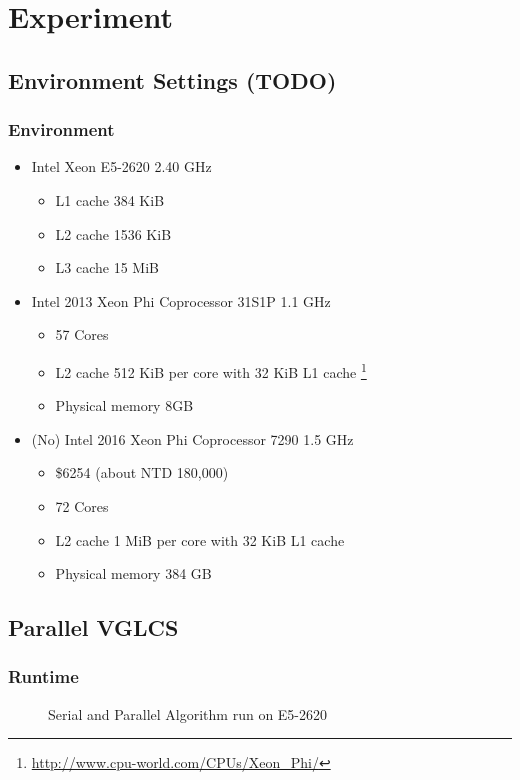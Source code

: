 \section{Experiment}

\subsection{Environment Settings (TODO)}
\begin{frame}
    \frametitle{Environment}
    \begin{itemize}
    	\item Intel Xeon E5-2620 2.40 GHz
    		\begin{itemize}
    		 	\item L1 cache 384 KiB
    		 	\item L2 cache 1536 KiB
    		 	\item L3 cache 15 MiB
    		 \end{itemize}
    	\item Intel 2013 Xeon Phi Coprocessor 31S1P 1.1 GHz
    		\begin{itemize}
    			\item 57 Cores
    			\item L2 cache 512 KiB per core with 32 KiB L1 cache
    			\footnote{\url{http://www.cpu-world.com/CPUs/Xeon_Phi/}}
    			\item Physical memory 8GB
    		\end{itemize}
    	\item (No) Intel 2016 Xeon Phi Coprocessor 7290 1.5 GHz
    		\begin{itemize}
    			\item \$6254 (about NTD 180,000)
    			\item 72 Cores
    			\item L2 cache 1 MiB per core with 32 KiB L1 cache
    			\item Physical memory 384 GB
    		\end{itemize}
    \end{itemize}
\end{frame}

\subsection{Parallel VGLCS}
\begin{frame}
	\frametitle{Runtime}
	\begin{figure}[!ht]
		\centering
		\subfigure[Runtime]{
			
			\label{fig:fig-parallel}
		}
		\caption{Serial and Parallel Algorithm run on E5-2620}
	\end{figure}
\end{frame}

